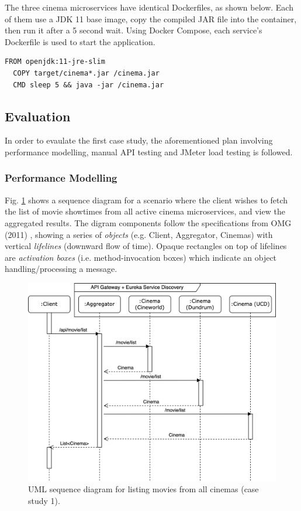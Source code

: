 The three cinema microservices have identical Dockerfiles, as shown below. Each of them use a JDK 11 base image, copy the compiled JAR file into the container, then run it after a 5 second wait. Using Docker Compose, each service's Dockerfile is used to start the application.

\begin{lstlisting}[caption=Dockerfile for cinema services]
  FROM openjdk:11-jre-slim
  COPY target/cinema*.jar /cinema.jar
  CMD sleep 5 && java -jar /cinema.jar
\end{lstlisting}


\subsection{Evaluation}

In order to evaulate the first case study, the aforementioned plan involving performance modelling, manual API testing and JMeter load testing is followed.

\subsubsection{Performance Modelling}

Fig. \ref{fig:cs01-sequence} shows a sequence diagram for a scenario where the client wishes to fetch the list of movie showtimes from all active cinema microservices, and view the aggregated results. The digram components follow the specifications from OMG (2011) \cite{omg11}, showing a series of \textit{objects} (e.g. Client, Aggregator, Cinemas) with vertical \textit{lifelines} (downward flow of time). Opaque rectangles on top of lifelines are \textit{activation boxes} (i.e. method-invocation boxes) which indicate an object handling/processing a message.

\begin{figure}[H]
	\centering
	\includegraphics[width=0.75\linewidth]{./assets/diagrams/cs01-sequence.png}
	\caption{UML sequence diagram for listing movies from all cinemas (case study 1).}
	\label{fig:cs01-sequence}
\end{figure}

